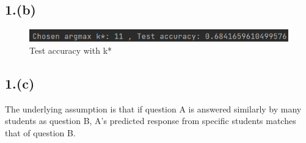 \documentclass{article}
\begin{document}
\subsection*{1.(b)}

\begin{figure}[H]
    \centering
    \includegraphics[width=\textwidth]{knn_impute_by_user_test.png}
    \caption{Test accuracy with k*}
\end{figure}

\subsection*{1.(c)}

The underlying assumption is that if question A is answered similarly by many students as question B, A’s predicted response from specific students matches that of question B.
\end{document}
